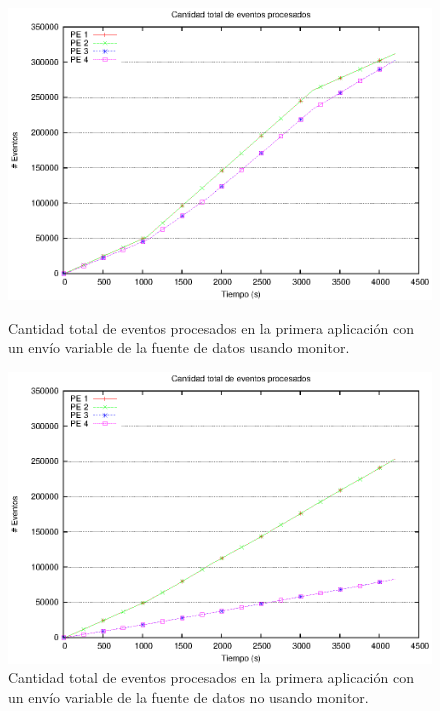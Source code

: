 \begin{figure}[ht]
\centering

\begin{minipage}[c]{0.45\textwidth}
\centering
    \includegraphics[width=\textwidth]{images/exp/app1/normal/cm/eventCount.eps}
    \caption{Cantidad total de eventos procesados en la primera aplicación con un envío variable de la fuente de datos usando monitor.}
    \label{fig:app1-normal-eventCount-cm}
\end{minipage} \hspace*{1cm}
\begin{minipage}[c]{0.45\textwidth}
\centering
    \includegraphics[width=\textwidth]{images/exp/app1/normal/sm/eventCount.eps}
    \caption{Cantidad total de eventos procesados en la primera aplicación con un envío variable de la fuente de datos no usando monitor.}
    \label{fig:app1-normal-eventCount-sm}
\end{minipage}

\end{figure}

